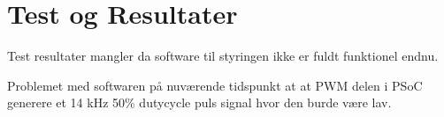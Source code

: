 \chapter{Test og Resultater}

Test resultater mangler da software til styringen ikke er fuldt funktionel endnu. 

Problemet med softwaren på nuværende tidspunkt at at PWM delen i PSoC generere et 14 kHz 50\% dutycycle puls signal hvor den burde være lav.